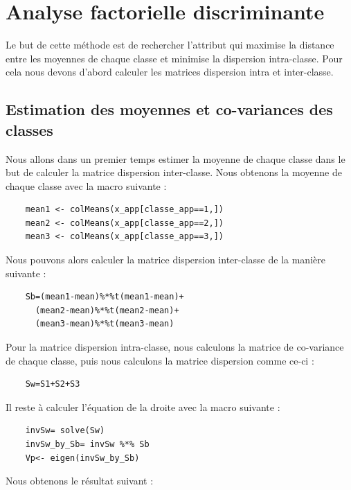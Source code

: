 \documentclass[a4paper,11pt]{article}
\begin{document}
  \section{Analyse factorielle discriminante}
  
  Le but de cette méthode est de rechercher l'attribut qui maximise la distance entre
  les moyennes de chaque classe et minimise la dispersion intra-classe. Pour cela nous
  devons d'abord calculer les matrices dispersion intra et inter-classe.
  
  \subsection{Estimation des moyennes et co-variances des classes}
  Nous allons dans un premier temps estimer la moyenne de chaque classe dans le but
  de calculer la matrice dispersion inter-classe. Nous obtenons la moyenne de chaque 
  classe avec la macro suivante : 
  
  \begin{lstlisting}
    mean1 <- colMeans(x_app[classe_app==1,])
    mean2 <- colMeans(x_app[classe_app==2,])
    mean3 <- colMeans(x_app[classe_app==3,])
  \end{lstlisting}

  Nous pouvons alors calculer la matrice dispersion inter-classe de la manière suivante :
  
  \begin{lstlisting}
    Sb=(mean1-mean)%*%t(mean1-mean)+
      (mean2-mean)%*%t(mean2-mean)+
      (mean3-mean)%*%t(mean3-mean)
  \end{lstlisting}
  
  Pour la matrice dispersion intra-classe, nous calculons la matrice de co-variance de chaque
  classe, puis nous calculons la matrice dispersion comme ce-ci : 
  
  \begin{lstlisting}
    Sw=S1+S2+S3
  \end{lstlisting}
  
  Il reste à calculer l'équation de la droite avec la macro suivante : 
  
  \begin{lstlisting}
    invSw= solve(Sw)
    invSw_by_Sb= invSw %*% Sb
    Vp<- eigen(invSw_by_Sb)
  \end{lstlisting}
  
  Nous obtenons le résultat suivant : 
  
\end{document}
